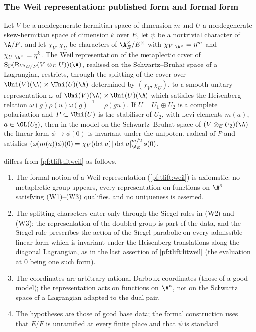 \subsubsection*{The Weil representation: published form and formal form}
\begin{littheorem}\label{pf:tlift:litweil}
Let $V$ be a nondegenerate hermitian space of dimension $m$ and $U$ a nondegenerate skew-hermitian space of
dimension $k$ over $E$, let $\psi$ be a nontrivial character of $\A/F$, and let $\chi_V,\chi_U$ be characters of
$\tliftAE^\times/E^\times$ with $\chi_V|_{\A^\times}=\eta^m$ and $\chi_U|_{\A^\times}=\eta^k$. The Weil representation of the
metaplectic cover of $\mathrm{Sp}(\mathrm{Res}_{E/F}(V\otimes_EU))(\A)$, realised on the Schwartz--Bruhat space of a
Lagrangian, restricts, through the splitting of the cover over $\Uni(V)(\A)\times\Uni(U)(\A)$ determined by
$(\chi_V,\chi_U)$, to a smooth unitary representation $\omega$ of $\Uni(V)(\A)\times\Uni(U)(\A)$ which satisfies the
Heisenberg relation $\omega(g)\rho(u)\omega(g)^{-1}=\rho(g u)$. If $U=U_1\oplus U_2$ is a complete polarisation and
$P\subset\Uni(U)$ is the stabiliser of $U_2$, with Levi elements $m(a)$, $a\in\GL(U_2)$, then in the model on the
Schwartz--Bruhat space of $(V\otimes_EU_2)(\A)$ the linear form $\phi\mapsto\phi(0)$ is invariant under the unipotent
radical of $P$ and satisfies $(\omega(m(a))\phi)(0)=\chi_V(\det a)\,|\det a|_{\tliftAE}^{m/2}\,\phi(0)$.
\end{littheorem}

\begin{remark}\label{pf:tlift:remweil}
 differs from \cref{pf:tlift:litweil} as follows.
\begin{enumerate}[label=(\alph*),nosep]
\item The formal notion of a Weil representation (\cref{pf:tlift:weil}) is axiomatic: no metaplectic group
  appears, every representation on functions on $\A^\kappa$ satisfying (W1)--(W3) qualifies, and no uniqueness is
  asserted.
\item The splitting characters enter only through the Siegel rules in (W2) and (W3): the representation of the
  doubled group is part of the data, and the Siegel rule prescribes the action of the Siegel parabolic on every
  admissible linear form which is invariant under the Heisenberg translations along the diagonal Lagrangian, as
  in the last assertion of \cref{pf:tlift:litweil} (the evaluation at $0$ being one such form).
\item The coordinates are arbitrary rational Darboux coordinates (those of a good model); the representation acts
  on functions on $\A^\kappa$, not on the Schwartz space of a Lagrangian adapted to the dual pair.
\item The hypotheses are those of good base data; the formal construction uses that $E/F$ is unramified at every
  finite place and that $\psi$ is standard.
\end{enumerate}
\end{remark}

